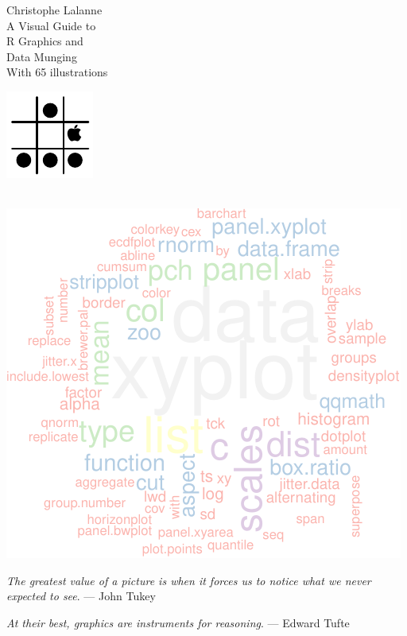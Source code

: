 \documentclass[a4paper,twoside]{book}
\newlength{\tpheight}\setlength{\tpheight}{0.9\textheight}
\newlength{\txtheight}\setlength{\txtheight}{0.9\tpheight}
\begin{document}
\pagestyle{empty}

\begingroup%
\raggedleft
\vspace*{\baselineskip}
{\Large\textsf{Christophe Lalanne}}\\[0.167\txtheight]
{\Large\titlefont A Visual Guide to}\\[\baselineskip]
{\textcolor{Medium}{\Huge\titlefont R Graphics and}}\\[\baselineskip]
{\textcolor{Medium}{\Huge\titlefont Data Munging}}\\[\baselineskip]
{\tiny\titlefont With 65 illustrations}\par
\vfill
{\includegraphics[scale=.75]{logo}\\{\small \tt \GITAbrHash}\\{\small
    \tt \VCDateTEX}}\par 
\vspace*{3\baselineskip}
\endgroup
\pagestyle{empty}
\cleardoublepage

\frontmatter
\pagestyle{empty}
\vspace*{\fill}
\centerline{\includegraphics[width=.6\textwidth]{wcindex}}
\vspace*{3\baselineskip}
\hfill{\footnotesize \emph{The greatest value of a picture is when it forces us to notice what we
never expected to see}. --- John Tukey}

\hfill{\footnotesize \emph{At their best, graphics are instruments for reasoning}. --- Edward Tufte}
\vspace*{\fill}
\cleardoublepage
{}
\tableofcontents
\end{document}
